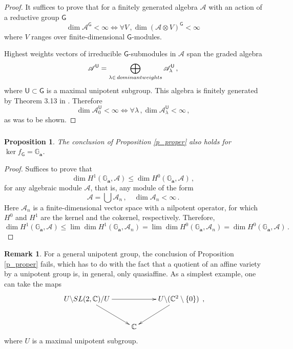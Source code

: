 \documentclass[14pt]{extarticle}
\newcommand{\C}{\mathbb{C}}
\newcommand{\Ga}{\mathbb{G}_\mathbf{a}}
\newcommand{\bG}{\mathsf{G}}
\newcommand{\bU}{\mathsf{U}}
\newcommand{\cA}{\mathscr{A}}
\newtheorem{Proposition}[Lemma]{Proposition}
\theoremstyle{definition}
\newtheorem{Remark}{Remark}[section]
\begin{document}
\begin{proof}
It suffices to prove that for a finitely generated algebra $\cA$ with
an action of a reductive group $\bG$
\[
  \dim \cA^{\bG} < \infty
\Leftrightarrow \forall V\,, \dim (\cA \otimes V) ^{\bG} < \infty
\]
where $V$ ranges over finite-dimensional $\bG$-modules.

Highest weights vectors of irreducible $\bG$-submodules in $\cA$
span the graded algebra
%
\begin{equation}
  \label{grA}
  \cA^\bU = \bigoplus_{\lambda \in \,  \textup{dominant weights}}
  \cA^\bU_\lambda \,,
\end{equation}
%
where $\bU \subset \bG$ is a
maximal unipotent subgroup. This algebra is finitely generated by
Theorem 3.13 in \cite{VinPop}. Therefore
\[
  \dim \cA^{\bU}_0 < \infty
\Leftrightarrow \forall \lambda \,, \dim \cA_\lambda^{\bU} < \infty\,,
\]
as was to be shown. 
\end{proof}


\subsubsection{}

\begin{Proposition}
  The conclusion of Proposition \ref{p_proper} also holds
  for $\ker f_\bG=\Ga$. 
\end{Proposition}

\begin{proof}
 Suffices to prove that 
 \[
   \dim H^1(\Ga,\cA) \le \dim H^0(\Ga,\cA) \,,
  \]
  for any algebraic module $\cA$, that is, any module of the form
  \[
    \cA = \bigcup \cA_n\,, \quad \dim \cA_n < \infty \,. 
  \]
  Here $\cA_n$ is a finite-dimensional vector space with a nilpotent
  operator, for which $H^0$ and $H^1$ are the kernel and the cokernel,
respectively. Therefore, 
\[
  \dim H^1(\Ga,\cA)  \le \lim \dim H^1(\Ga,\cA_n) =
  \lim \dim H^0(\Ga,\cA_n)  = \dim H^0(\Ga,\cA)  \,.
  \]
\end{proof}

\begin{Remark}
For a general unipotent group, the conclusion of
Proposition \ref{p_proper} fails, which has to do with the fact that
a quotient of an affine variety by a unipotent group is, in general,
only quasiaffine. As a simplest example, one can take
the maps
%
\begin{equation}
  \label{eq:94}
  \xymatrix{
    U \backslash SL(2,\C) /U \ar[rr] \ar[dr] && U \backslash (\C^2 \setminus
    \{0\}) \ar[dl]\\
    & \C }\,, 
\end{equation}
where $U$ is a maximal unipotent subgroup. 
\end{Remark}
\end{document}
